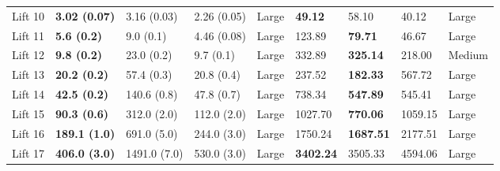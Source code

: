 \begin{tabular}{lllllllll}
Lift 10 & \textbf{3.02 (0.07)} &           3.16 (0.03) &        2.26 (0.05) &       Large &          \textbf{49.12} &                       58.10 &                    40.12 &       Large \\
Lift 11 &   \textbf{5.6 (0.2)} &             9.0 (0.1) &        4.46 (0.08) &       Large &                  123.89 &              \textbf{79.71} &                    46.67 &       Large \\
Lift 12 &   \textbf{9.8 (0.2)} &            23.0 (0.2) &          9.7 (0.1) &       Large &                  332.89 &             \textbf{325.14} &                   218.00 &      Medium \\
Lift 13 &  \textbf{20.2 (0.2)} &            57.4 (0.3) &         20.8 (0.4) &       Large &                  237.52 &             \textbf{182.33} &                   567.72 &       Large \\
Lift 14 &  \textbf{42.5 (0.2)} &           140.6 (0.8) &         47.8 (0.7) &       Large &                  738.34 &             \textbf{547.89} &                   545.41 &       Large \\
Lift 15 &  \textbf{90.3 (0.6)} &           312.0 (2.0) &        112.0 (2.0) &       Large &                 1027.70 &             \textbf{770.06} &                  1059.15 &       Large \\
Lift 16 & \textbf{189.1 (1.0)} &           691.0 (5.0) &        244.0 (3.0) &       Large &                 1750.24 &            \textbf{1687.51} &                  2177.51 &       Large \\
Lift 17 & \textbf{406.0 (3.0)} &          1491.0 (7.0) &        530.0 (3.0) &       Large &        \textbf{3402.24} &                     3505.33 &                  4594.06 &       Large \\
\bottomrule
\end{tabular}
